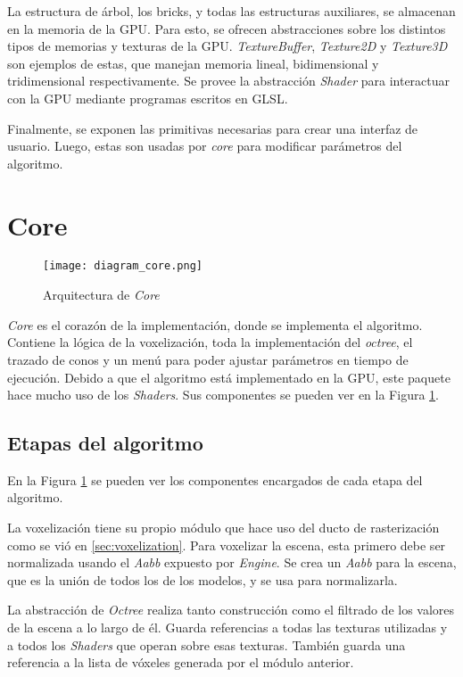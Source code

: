 La estructura de árbol, los bricks, y todas las estructuras auxiliares, se almacenan en la memoria de la GPU.
Para esto, se ofrecen abstracciones sobre los distintos tipos de memorias y texturas de la GPU.
\textit{TextureBuffer}, \textit{Texture2D} y \textit{Texture3D} son ejemplos de estas, que manejan memoria lineal, bidimensional y tridimensional respectivamente.
Se provee la abstracción \textit{Shader} para interactuar con la GPU mediante programas escritos en GLSL.

Finalmente, se exponen las primitivas necesarias para crear una interfaz de usuario.
Luego, estas son usadas por \textit{core} para modificar parámetros del algoritmo.

\section{Core}

\begin{figure}[ht]
    \centering
    \texttt{[image: diagram\_core.png]}
    \caption{Arquitectura de \textit{Core}}
    \label{fig:core_architecture}
\end{figure}

\textit{Core} es el corazón de la implementación, donde se implementa el algoritmo.
Contiene la lógica de la voxelización, toda la implementación del \textit{octree}, el trazado de conos y un menú para poder ajustar parámetros en tiempo de ejecución.
Debido a que el algoritmo está implementado en la GPU, este paquete hace mucho uso de los \textit{Shaders}.
Sus componentes se pueden ver en la Figura \ref{fig:core_architecture}.

\subsection{Etapas del algoritmo}

En la Figura \ref{fig:core_architecture} se pueden ver los componentes encargados de cada etapa del algoritmo.

La voxelización tiene su propio módulo que hace uso del ducto de rasterización como se vió en \ref{sec:voxelization}.
Para voxelizar la escena, esta primero debe ser normalizada usando el \textit{Aabb} expuesto por \textit{Engine}.
Se crea un \textit{Aabb} para la escena, que es la unión de todos los de los modelos, y se usa para normalizarla.

La abstracción de \textit{Octree} realiza tanto construcción como el filtrado de los valores de la escena a lo largo de él.
Guarda referencias a todas las texturas utilizadas y a todos los \textit{Shaders} que operan sobre esas texturas.
También guarda una referencia a la lista de vóxeles generada por el módulo anterior.

